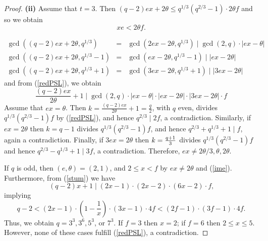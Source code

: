 \documentclass[a4paper,twopage,reqno,12pt]{amsart}
\theoremstyle{definition}
\numberwithin{equation}{section}
\renewcommand{\leq}{\leqslant}
\begin{document}
\begin{proof}
\noindent \textbf{(ii)} Assume that $t=3$. Then $\left( q-2\right) ex+2\theta\leq
q^{1/3}(q^{2/3}-1)\cdot 2 \theta f$ and so we obtain 
\begin{equation}\label{ime}
xe<2\theta f\text{.}    
\end{equation}

\begin{eqnarray*}
\gcd \left( \left( q-2\right) ex+2\theta ,q^{1/3}\right)  &=&\gcd \left(
2ex-2\theta ,q^{1/3}\right) \mid \gcd(2,q)\cdot |ex-\theta | \\
\gcd \left( \left( q-2\right) ex+2\theta ,q^{1/3}-1\right)  &=&\gcd \left(
ex-2\theta ,q^{1/3}-1\right) \mid |ex-2\theta|  \\
\gcd \left( \left( q-2\right) ex+2\theta ,q^{1/3}+1\right)  &=&\gcd \left(
3ex-2\theta ,q^{1/3}+1\right) \mid |3ex-2\theta| 
\end{eqnarray*}%
and from (\ref{redPSL}), we obtain
\begin{equation}\label{stum}
\frac{\left( q-2\right) ex}{2\theta }+1\mid \gcd(2,q)\cdot |ex-\theta |\cdot \left|
ex-2\theta \right| \cdot \left| 3ex-2\theta \right| \cdot f
\end{equation}
Assume that $ex=\theta $. Then $k=\frac{\left( q-2\right) ex}{2\theta }%
+1=\frac{q}{2}$, with $q$ even, divides $q^{1/3}(q^{2/3}-1)f$ by (\ref{redPSL}), and hence $%
q^{2/3}\mid 2f$, a contradiction. Similarly, if $%
ex=2\theta $ then $k=q-1$ divides $q^{1/3}(q^{2/3}-1)f$,
and hence $q^{2/3}+q^{1/3}+1\mid f$, again a contradiction. Finally, if $3ex=2\theta $ then $k=\frac{%
q+1}{3}$ divides $q^{1/3}(q^{2/3}-1)f$ and
hence $q^{2/3}-q^{1/3}+1\mid 3f$, a contradiction. Therefore, $ex\neq 2\theta/3,\theta, 2\theta $.

If $q$ is odd, then $(e,\theta )=(2,1)$, and $2\leq x<f$ by $ex\neq 2\theta $ and (\ref{ime}). 
Furthermore, from (\ref{stum}) we have
\begin{equation}\label{BaptLeonD}
\left( q-2\right) x+1 \mid (2x-1)\cdot \left( 2x-2\right) \cdot \left(
6x-2\right) \cdot f\text{,} 
\end{equation}
implying
\begin{equation*}
q-2 < (2x-1) 
\cdot \left( 1-\frac{1}{x}\right) 
\cdot \left( 3x-1\right) \cdot 4f 
<(2f-1) \cdot \left( 3f-1\right) \cdot 4f. 
\end{equation*}
Thus, we obtain $q=3^{3},3^{6},5^{3}$, or $7^{3}$. %
If $f=3$ then $x=2$;
if $f=6$ then $2\le x\le 5$.
However, none of these cases fulfill (\ref{redPSL}), a contradiction. 



\end{proof}
\end{document}
